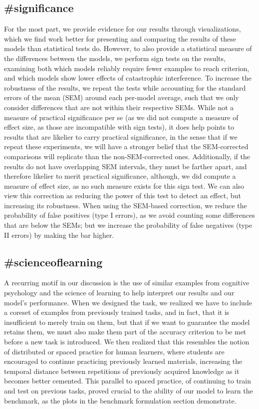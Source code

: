 \subsection{\#significance}
For the most part, we provide evidence for our results through visualizations, which we find work better for presenting and comparing the results of these models than statistical tests do. However, to also provide a statistical measure of the differences between the models, we perform sign tests on the results, examining both which models reliably require fewer examples to reach criterion, and which models show lower effects of catastrophic interference. To increase the robustness of the results, we repeat the tests while accounting for the standard errors of the mean (SEM) around each per-model average, such that we only consider differences that are not within their respective SEMs. While not a measure of practical significance per se (as we did not compute a measure of effect size, as those are incompatible with sign tests), it does help points to results that are likelier to carry practical significance, in the sense that if we repeat these experiments, we will have a stronger belief that the SEM-corrected comparisons will replicate than the non-SEM-corrected ones. Additionally, if the results do not have overlapping SEM intervals, they must be farther apart, and therefore likelier to merit practical significance, although, we did compute a measure of effect size, as no such measure exists for this sign test. We can also view this correction as reducing the power of this test to detect an effect, but increasing its robustness. When using the SEM-based correction, we reduce the probability of false positives (type I errors), as we avoid counting some differences that are below the SEMs; but we increase the probability of false negatives (type II errors) by making the bar higher. 

\subsection{\#scienceoflearning}
A recurring motif in our discussion is the use of similar examples from cognitive psychology and the science of learning to help interpret our results and our model's performance. When we designed the task, we realized we have to include a coreset of examples from previously trained tasks, and in fact, that it is insufficient to merely train on them, but that if we want to guarantee the model retains them, we must also make them part of the accuracy criterion to be met before a new task is introduced. We then realized that this resembles the notion of distributed or spaced practice for human learners, where students are encouraged to continue practicing previously learned materials, increasing the temporal distance between repetitions of previously acquired knowledge as it becomes better cemented. This parallel to spaced practice, of continuing to train and test on previous tasks, proved crucial to the ability of our model to learn the benchmark, as the plots in the benchmark formulation section demonstrate.

